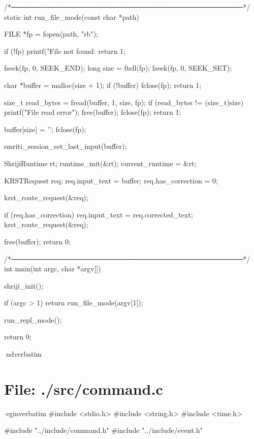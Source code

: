 \documentclass{article}
\begin{document}
/*──────────────────────────────────────────────*/
static int run_file_mode(const char *path)
{
    FILE *fp = fopen(path, "rb");

    if (!fp)
    {
        printf("File not found: %
        return 1;
    }

    fseek(fp, 0, SEEK_END);
    long size = ftell(fp);
    fseek(fp, 0, SEEK_SET);

    char *buffer = malloc(size + 1);
    if (!buffer)
    {
        fclose(fp);
        return 1;
    }

    size_t read_bytes = fread(buffer, 1, size, fp);
    if (read_bytes != (size_t)size)
    {
        printf("File read error\n");
        free(buffer);
        fclose(fp);
        return 1;
    }

    buffer[size] = '\0';
    fclose(fp);

    smriti_session_set_last_input(buffer);

    ShrijiRuntime rt;
    runtime_init(&rt);
    current_runtime = &rt;

    KRSTRequest req;
    req.input_text = buffer;
    req.has_correction = 0;

    krst_route_request(&req);

    if (req.has_correction)
    {
        req.input_text = req.corrected_text;
        krst_route_request(&req);
    }

    free(buffer);
    return 0;
}

/*──────────────────────────────────────────────*/
int main(int argc, char *argv[])
{
    shriji_init();

    if (argc > 1)
        return run_file_mode(argv[1]);

    run_repl_mode();

    return 0;
}
nd{verbatim}
\section*{File: ./src/command.c}
egin{verbatim}
#include <stdio.h>
#include <string.h>
#include <time.h>

#include "../include/command.h"
#include "../include/event.h"
\end{document}
